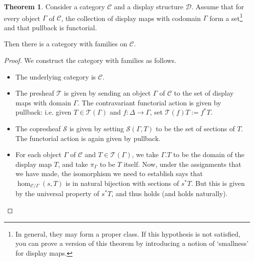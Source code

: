 \documentclass{article}
\theoremstyle{definition}
\newtheorem{theorem}[definition]{Theorem}
\newcommand{\types}{\mathcal T}
\newcommand{\terms}{\mathcal S}
\newcommand{\C}{\mathcal C}
\newcommand{\D}{\mathcal D}
\begin{document}
\begin{theorem}
    Consider a category $\C$ and a display structure $\D$. Assume that for every object $\Gamma$ of $\C$, the collection of display maps with codomain $\Gamma$ form a set\footnote{In general, they may form a proper class. If this hypothesis is not satisfied, you can prove a version of this theorem by introducing a notion of `smallness' for display maps.} and that pullback is functorial.

    Then there is a category with families on $\C$.
\end{theorem}
\begin{proof}
    We construct the category with families as follows.
    \begin{itemize}
        \item The underlying category is $\C$.
        \item The presheaf $\types$ is given by sending an object $\Gamma$ of $\C$ to the set of display maps with domain $\Gamma$. The contravariant functorial action is given by pullback: i.e. given $T \in \types (\Gamma)$ and $f: \Delta \to \Gamma$, set $\types (f) T := f^* T$.
        \item The copresheaf $\terms$ is given by setting $\terms (\Gamma , T)$ to be the set of sections of $T$. The functorial action is again given by pullback.
        \item For each object $\Gamma$ of $\C$ and $T \in \types (\Gamma)$, we take $\Gamma.T$ to be the domain of the display map $T$, and take $\pi_\Gamma$ to be $T$ itself. Now, under the assignments that we have made, the isomorphism we need to establish says that $\hom_{\C / \Gamma}(s, T)$ is in natural bijection with sections of $s^* T$. But this is given by the universal property of $s^* T$, and thus holds (and holds naturally). \qedhere
    \end{itemize}
\end{proof}
\end{document}
